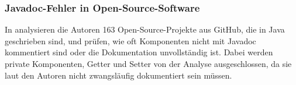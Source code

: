 \subsubsection{Javadoc-Fehler in Open-Source-Software}
In \cite[S.~249ff.]{JavadocViolationsandTheirEvolutioninOpen-SourceSoftware} analysieren die Autoren 163 Open-Source-Projekte aus GitHub, die in Java geschrieben sind, und prüfen, wie oft Komponenten nicht mit Javadoc kommentiert sind oder die Dokumentation unvollständig ist. Dabei werden private Komponenten, Getter und Setter von der Analyse ausgeschlossen, da sie laut den Autoren nicht zwangsläufig dokumentiert sein müssen. 

